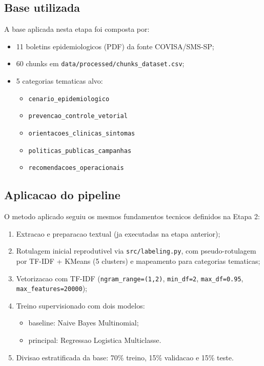 \documentclass[12pt,a4paper]{article}
\begin{document}
\subsection{Base utilizada}
A base aplicada nesta etapa foi composta por:
\begin{itemize}[leftmargin=1.2cm]
    \item 11 boletins epidemiologicos (PDF) da fonte COVISA/SMS-SP;
    \item 60 chunks em \texttt{data/processed/chunks\_dataset.csv};
    \item 5 categorias tematicas alvo:
    \begin{itemize}
        \item \texttt{cenario\_epidemiologico}
        \item \texttt{prevencao\_controle\_vetorial}
        \item \texttt{orientacoes\_clinicas\_sintomas}
        \item \texttt{politicas\_publicas\_campanhas}
        \item \texttt{recomendacoes\_operacionais}
    \end{itemize}
\end{itemize}

\subsection{Aplicacao do pipeline}
O metodo aplicado seguiu os mesmos fundamentos tecnicos definidos na Etapa 2:
\begin{enumerate}[leftmargin=1.2cm]
    \item Extracao e preparacao textual (ja executadas na etapa anterior);
    \item Rotulagem inicial reprodutivel via \texttt{src/labeling.py}, com pseudo-rotulagem por TF-IDF + KMeans (5 clusters) e mapeamento para categorias tematicas;
    \item Vetorizacao com TF-IDF (\texttt{ngram\_range=(1,2)}, \texttt{min\_df=2}, \texttt{max\_df=0.95}, \texttt{max\_features=20000});
    \item Treino supervisionado com dois modelos:
    \begin{itemize}
        \item baseline: Naive Bayes Multinomial;
        \item principal: Regressao Logistica Multiclasse.
    \end{itemize}
    \item Divisao estratificada da base: 70\% treino, 15\% validacao e 15\% teste.
\end{enumerate}
\end{document}
